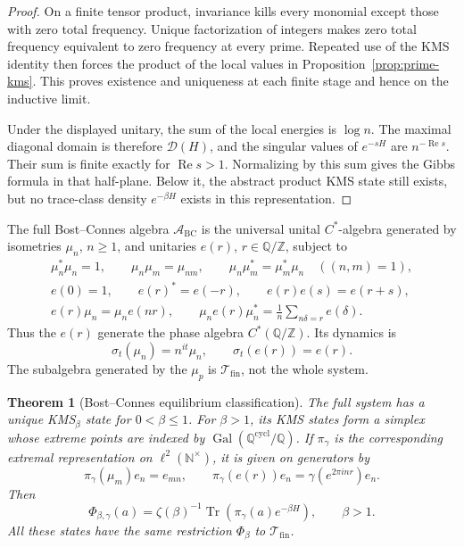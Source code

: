 \documentclass[11pt]{article}
\theoremstyle{plain}
\newtheorem{theorem}{Theorem}[section]
\theoremstyle{definition}
\theoremstyle{remark}
\begin{document}
\begin{proof}
On a finite tensor product, invariance kills every monomial except those
with zero total frequency.  Unique factorization of integers makes zero
total frequency equivalent to zero frequency at every prime.  Repeated use
of the KMS identity then forces the product of the local values in
Proposition~\ref{prop:prime-kms}.  This proves existence and uniqueness at
each finite stage and hence on the inductive limit.

Under the displayed unitary, the sum of the local energies is \(\log n\).
The maximal diagonal domain is therefore \(\mathcal D(H)\), and the
singular values of \(e^{-sH}\) are \(n^{-\operatorname{Re}s}\).  Their
sum is finite exactly for \(\operatorname{Re}s>1\).  Normalizing by this
sum gives the Gibbs formula in that half-plane.  Below it, the abstract
product KMS state still exists, but no trace-class density
\(e^{-\beta H}\) exists in this representation.
\end{proof}

The full Bost--Connes algebra \(\mathcal A_{\mathrm{BC}}\) is the universal
unital \(C^*\)-algebra generated by isometries \(\mu_n\), \(n\geq1\), and
unitaries \(e(r)\), \(r\in\mathbb Q/\mathbb Z\), subject to
\[
\begin{gathered}
 \mu_n^*\mu_n=1,\qquad \mu_n\mu_m=\mu_{nm},\qquad
 \mu_n\mu_m^*=\mu_m^*\mu_n\quad ((n,m)=1),\\
 e(0)=1,\qquad e(r)^*=e(-r),\qquad e(r)e(s)=e(r+s),\\
 e(r)\mu_n=\mu_ne(nr),\qquad
 \mu_ne(r)\mu_n^*=\frac1n\sum_{n\delta=r}e(\delta).
\end{gathered}
\]
Thus the \(e(r)\) generate the phase algebra
\(C^*(\mathbb Q/\mathbb Z)\).  Its dynamics is
\[
 \sigma_t(\mu_n)=n^{it}\mu_n,
 \qquad \sigma_t(e(r))=e(r).
\]
The subalgebra generated by the \(\mu_p\) is
\(\mathcal T_{\mathrm{fin}}\), not the whole system.

\begin{theorem}[Bost--Connes equilibrium classification]
\label{thm:bc}
The full system has a unique KMS\(_\beta\) state for
\(0<\beta\leq1\).  For \(\beta>1\), its KMS states form a simplex whose
extreme points are indexed by
\(\operatorname{Gal}(\mathbb Q^{\mathrm{cycl}}/\mathbb Q)\).  If
\(\pi_\gamma\) is the corresponding extremal representation on
\(\ell^2(\mathbb N^\times)\), it is given on generators by
\[
 \pi_\gamma(\mu_m)e_n=e_{mn},\qquad
 \pi_\gamma(e(r))e_n=\gamma(e^{2\pi i nr})e_n.
\]
Then
\[
 \Phi_{\beta,\gamma}(a)=\zeta(\beta)^{-1}
 \operatorname{Tr}(\pi_\gamma(a)e^{-\beta H}),
 \qquad \beta>1.
\]
All these states have the same restriction \(\Phi_\beta\) to
\(\mathcal T_{\mathrm{fin}}\).
\end{theorem}
\end{document}
